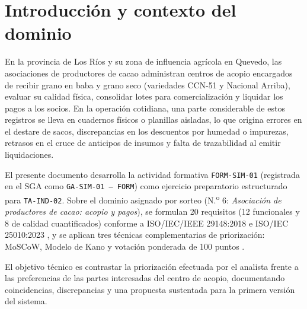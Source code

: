 \section{Introducci\'on y contexto del dominio}
\label{sec:introduccion}

En la provincia de Los R\'ios y su zona de influencia agr\'icola en Quevedo, las asociaciones de productores de cacao administran centros de acopio encargados de recibir grano en baba y grano seco (variedades CCN-51 y Nacional Arriba), evaluar su calidad f\'isica, consolidar lotes para comercializaci\'on y liquidar los pagos a los socios. En la operaci\'on cotidiana, una parte considerable de estos registros se lleva en cuadernos f\'isicos o planillas aisladas, lo que origina errores en el destare de sacos, discrepancias en los descuentos por humedad o impurezas, retrasos en el cruce de anticipos de insumos y falta de trazabilidad al emitir liquidaciones.

El presente documento desarrolla la actividad formativa \texttt{FORM-SIM-01} (registrada en el SGA como \texttt{GA-SIM-01 -- FORM}) como ejercicio preparatorio estructurado para \texttt{TA-IND-02}. Sobre el dominio asignado por sorteo (N.\textsuperscript{o} 6: \textit{Asociaci\'on de productores de cacao: acopio y pagos}), se formulan 20 requisitos (12 funcionales y 8 de calidad cuantificados) conforme a ISO/IEC/IEEE 29148:2018 \cite{iso29148} e ISO/IEC 25010:2023 \cite{iso25010}, y se aplican tres t\'ecnicas complementarias de priorizaci\'on: MoSCoW, Modelo de Kano y votaci\'on ponderada de 100 puntos \cite{pohl2025,wiegers2013,ireb2026}.

El objetivo t\'ecnico es contrastar la priorizaci\'on efectuada por el analista frente a las preferencias de las partes interesadas del centro de acopio, documentando coincidencias, discrepancias y una propuesta sustentada para la primera versi\'on del sistema.
